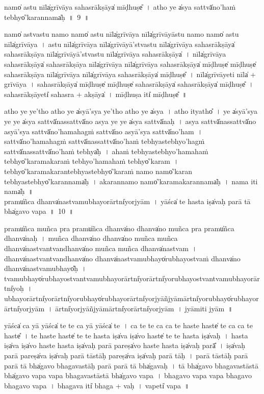 \documentclass[parskip, DIV=14]{scrartcl}
\begin{document}
{\vspace{0.5cm}
namo̍ astu॒ nīla̍grīvāya sahasrā॒kṣāya̍ mī॒ḍhuṣe̎~।
atho॒ ye a̍sya॒ sattvā̍no॒'haṁ tebhyo̍'kara॒nnama̍ḥ~॥~9~॥

namo̍ astvastu॒ namo॒ namo̍ astu॒ nīla̍grīvāya॒ nīla̍grīvāyāstu॒ namo॒ namo̍ astu॒ nīla̍grīvāya~।
a॒stu॒ nīla̍grīvāya॒  nīla̍grīvāyā'stvastu॒ nīla̍grīvāya sahasrā॒kṣāya̍ sahasrā॒kṣāya॒ nīla̍grīvāyā'stvastu॒ nīla̍grīvāya sahasrā॒kṣāya̍~।
nīla̍grīvāya sahasrā॒kṣāya̍ sahasrā॒kṣāya॒ nīla̍grīvāya॒ nīla̍grīvāya sahasrā॒kṣāya̍ mī॒ḍhuṣe̍ mī॒ḍhuṣe̍ sahasrā॒kṣāya॒ nīla̍grīvāya॒ nīla̍grīvāya sahasrā॒kṣāya̍ mī॒ḍhuṣe̎~। %
nīla̍grīvā॒yeti॒ nīla̍ + grī॒vā॒ya॒~।
sa॒ha॒srā॒kṣāya̍ mī॒ḍhuṣe̍ mī॒ḍhuṣe̍ sahasrā॒kṣāya̍ sahasrā॒kṣāya̍ mī॒ḍhuṣe̎~।
sa॒ha॒srā॒kṣāyeti̍ sahasra + a॒kṣāya̍~।
mī॒ḍhuṣa॒ iti̍ mī॒ḍhuṣe̎~॥ 

atho॒ ye ye'tho॒ atho॒ ye a̍syā'sya॒ ye'tho॒ atho॒ ye a̍sya~।
atho॒ ityatho̎~।
ye a̍syā'sya॒ ye ye a̍sya॒ sattvā̍na॒ssattvā̍no asya॒ ye ye a̍sya॒ sattvā̍naḥ~।
a॒sya॒ sattvā̍na॒ssattvā̍no asyā'sya॒ sattvā̍no॒'hama॒hagṁ sattvā̍no asyā'sya॒ sattvā̍no॒'ham~। %
sattvā̍no॒'hama॒hagṁ sattvā̍na॒ssattvā̍no॒'haṁ tebhya॒stebhyo॒'hagṁ sattvā̍na॒ssattvā̍no॒'haṁ tebhya̍ḥ~।
a॒haṁ tebhya॒stebhyo॒'hama॒haṁ tebhyo̍'karamakara॒ṁ tebhyo॒'hama॒haṁ tebhyo̍'karam~। %
tebhyo̍'karamakara॒ntebhya॒stebhyo̍'kara॒ṁ namo॒ namo̍'kara॒n  tebhya॒stebhyo̍'kara॒nnama̍ḥ~।
a॒ka॒ra॒nnamo॒ namo̍'karamakara॒nnama̍ḥ~।
nama॒ iti॒ nama̍ḥ~॥ \\

\vspace{0.5cm}
pramu̍ñca॒ dhanva̍na॒stvamu॒bhayo॒rārtni̍yo॒rjyām~।
yāśca̍ te॒ hasta॒ iṣa̍vaḥ parā॒ tā bha̍gavo vapa~॥~10~॥

pramu̍ñca muñca॒ pra pramu̍ñca॒ dhanva̍no॒ dhanva̍no muñca॒ pra pramu̍ñca॒ dhanva̍naḥ~।
mu॒ñca॒ dhanva̍no॒ dhanva̍no muñca muñca॒ dhanva̍na॒stvantvandhanva̍no muñca muñca॒ dhanva̍na॒stvam~।
dhanva̍na॒stvantvandhanva̍no॒ dhanva̍na॒stvamu॒bhayo̍ru॒bhayo॒stvaṁ dhanva̍no॒ dhanva̍na॒stvamu॒bhayo̎ḥ~।
tvamu॒bhayo̍ru॒bhayo॒stvantvamu॒bhayo॒rārtni̍yo॒rārtni̍yoru॒bhayo॒stvantvamu॒bhayo॒rārtni̍yoḥ~।
u॒bhayo॒rārtni̍yo॒rārtni̍yoru॒bhayo̍ru॒bhayo॒rārtni̍yo॒rjyāñjyāmārtni̍yoru॒bhayo̍ru॒bhayo॒rārtni̍yo॒rjyām~।
ārtni̍yo॒rjyāñjyāmārtni̍yo॒rārtni̍yo॒rjyām~।
jyāmiti॒  jyām~॥ 

yāśca̍ ca॒ yā yāśca̍ te te ca॒ yā yāśca̍ te~।
ca॒ te॒ te॒ ca॒ ca॒ te॒ haste॒ haste̍ te ca ca te॒ haste̎~।
te॒ haste॒ haste̍ te te॒ hasta॒ iṣa̍va॒ iṣa̍vo॒ haste̍ te te॒ hasta॒ iṣa̍vaḥ~।
hasta॒ iṣa̍va॒ iṣa̍vo॒ haste॒ hasta॒ iṣa̍vaḥ parā॒ pareṣa̍vo॒ haste॒ hasta॒ iṣa̍va॒ḥ parā̎~।
iṣa̍va॒ḥ parā॒ pareṣa̍va॒ iṣa̍va॒ḥ parā॒ tāstāḥ pareṣa̍va॒ iṣa̍va॒ḥ parā॒ tāḥ~।
parā॒ tāstāḥ parā॒ parā॒ tā bha̍gavo bhagava॒stāḥ parā॒ parā॒ tā bha̍gavaḥ~।
tā bha̍gavo bhagava॒stāstā bha̍gavo vapa vapa bhagava॒stāstā bha̍gavo vapa~।
bha॒ga॒vo॒ va॒pa॒ va॒pa॒ bha॒ga॒vo॒ bha॒ga॒vo॒ va॒pa॒~।
bha॒ga॒va॒ iti̍ bhaga + va॒ḥ~।
va॒peti̍  vapa~॥

}
\end{document}
